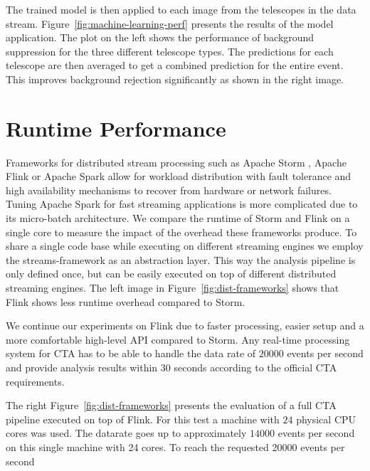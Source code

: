 \documentclass[11pt,twoside]{article}
\begin{document}
The trained model is then applied to each image from the telescopes in the data stream.
Figure~\ref{fig:machine-learning-perf} presents the results of the model application.
The plot on the left shows the performance of background suppression for the three different telescope types.
The predictions for each telescope are then averaged to get a combined prediction for the entire event.
This improves background rejection significantly as shown in the right image.



\section{Runtime Performance}


Frameworks for distributed stream processing such as Apache Storm \citep{storm}, Apache Flink \citep{flink} or Apache Spark \citep{spark}
allow for workload distribution with fault tolerance and high availability mechanisms to recover from hardware or network failures.
Tuning Apache Spark for fast streaming applications is more complicated due to its micro-batch architecture.
We compare the runtime of Storm and Flink on a single core to measure the impact of the overhead these frameworks produce.
To share a single code base while executing on different streaming engines we employ the streams-framework \citep{streams}
as an abstraction layer.
This way the analysis pipeline is only defined once, but can be easily executed on top of different distributed streaming engines.
The left image in Figure~\ref{fig:dist-frameworks} shows that Flink shows less runtime overhead compared to Storm.

We continue our experiments on Flink due to faster processing, easier setup and a more comfortable high-level API compared to Storm.
Any real-time processing system for CTA has to be able to handle the data rate of $20000$ events per second and provide analysis results
within 30 seconds according to the official CTA requirements.

The right Figure~\ref{fig:dist-frameworks} presents the evaluation of a full CTA pipeline executed on top of Flink.
For this test a machine with $24$ physical CPU cores was used.
The datarate goes up to approximately $14000$ events per second on this single machine with 24 cores.
To reach the requested 20000 events per second
\end{document}
